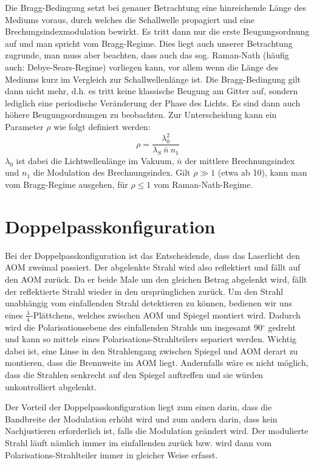 \documentclass[bigchapter,colorback,accentcolor=tud4b,linedtoc,11pt]{tudreport}
\begin{document}
Die Bragg-Bedingung setzt bei genauer Betrachtung eine hinreichende Länge des Mediums voraus, durch welches die Schallwelle propagiert und eine Brechungsindexmodulation bewirkt. Es tritt dann nur die erste Beugungsordnung auf und man spricht vom Bragg-Regime. Dies liegt auch unserer Betrachtung zugrunde, man muss aber beachten, dass auch das sog. Raman-Nath (häufig auch: Debye-Sears-Regime) vorliegen kann, vor allem wenn die Länge des Mediums kurz im Vergleich zur Schallwellenlänge ist. Die Bragg-Bedingung gilt dann nicht mehr, d.h. es tritt keine klassische Beugung am Gitter auf, sondern lediglich eine periodische Veränderung der Phase des Lichts. Es sind dann auch höhere Beugungsordnungen zu beobachten. Zur Unterscheidung kann ein Parameter $\rho$ wie folgt definiert werden: 
$$\rho = \frac{\lambda_0^2}{\lambda_S~\bar{n}~n_1}$$
$\lambda_0$ ist dabei die Lichtwellenlänge im Vakuum, $\bar{n}$ der mittlere Brechnungsindex und $n_1$ die Modulation des Brechnungsindex. Gilt $\rho \gg 1$ (etwa ab 10), kann man vom Bragg-Regime ausgehen, für $\rho \leq 1$ vom Raman-Nath-Regime.

\section{Doppelpasskonfiguration}

Bei der Doppelpasskonfiguration ist das Entscheidende, dass das Laserlicht den AOM zweimal passiert. Der abgelenkte Strahl wird also reflektiert und fällt auf den AOM zurück. Da er beide Male um den gleichen Betrag abgelenkt wird, fällt der reflektierte Strahl wieder in den ursprünglichen zurück. Um den Strahl unabhängig vom einfallenden Strahl detektieren zu können, bedienen wir uns eines $\frac{\lambda}{4}$-Plättchens, welches zwischen AOM und Spiegel montiert wird. Dadurch wird die Polarisationsebene des einfallenden Strahls um insgesamt 90$^{\circ}$ gedreht und kann so mittels eines Polarisations-Strahlteilers separiert werden. Wichtig dabei ist, eine Linse in den Strahlengang zwischen Spiegel und AOM derart zu montieren, dass die Brennweite im AOM liegt. Andernfalls wäre es nicht möglich, dass die Strahlen senkrecht auf den Spiegel auftreffen und sie würden unkontrolliert abgelenkt.

Der Vorteil der Doppelpasskonfiguration liegt zum einen darin, dass die Bandbreite der Modulation erhöht wird und zum andern darin, dass kein Nachjustieren erforderlich ist, falls die Modulation geändert wird. Der modulierte Strahl läuft nämlich immer im einfallenden zurück bzw. wird dann vom Polarisations-Strahlteiler immer in gleicher Weise erfasst.
\end{document}
